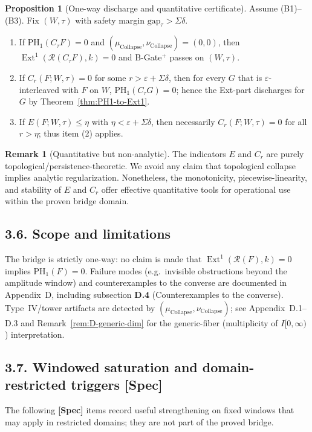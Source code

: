 \documentclass[11pt]{article}
\numberwithin{equation}{section}
\theoremstyle{plain}
\theoremstyle{definition}
\theoremstyle{remark}
\DeclareMathOperator{\Ext}{Ext}
\theoremstyle{plain}
\theoremstyle{definition}
\numberwithin{equation}{section}
\newtheorem{proposition}[theorem]{Proposition}
\theoremstyle{definition}
\newtheorem{remark}[theorem]{Remark}
\numberwithin{equation}{section}
\theoremstyle{plain}
\theoremstyle{definition}
\theoremstyle{remark}
\begin{document}
\begin{proposition}[One-way discharge and quantitative certificate]\label{prop:gate-certificate}
Assume \textup{(B1)}–\textup{(B3)}. Fix \((W,\tau)\) with safety margin \(\mathrm{gap}_\tau>\Sigma\delta\).
\begin{enumerate}
\item If \(\mathrm{PH}_1(C_\tau F)=0\) and \((\mu_{\mathrm{Collapse}},\nu_{\mathrm{Collapse}})=(0,0)\), then \(\Ext^1(\mathcal{R}(C_\tau F),k)=0\) and B-Gate\(^{+}\) passes on \((W,\tau)\).
\item If \(C_{r}(F;W,\tau)=0\) for some \(r>\varepsilon+\Sigma\delta\), then for every \(G\) that is \(\varepsilon\)-interleaved with \(F\) on \(W\), \(\mathrm{PH}_1(C_\tau G)=0\); hence the Ext-part discharges for \(G\) by Theorem~\ref{thm:PH1-to-Ext1}.
\item If \(E(F;W,\tau)\le \eta\) with \(\eta<\varepsilon+\Sigma\delta\), then necessarily \(C_r(F;W,\tau)=0\) for all \(r>\eta\); thus item \textup{(2)} applies.
\end{enumerate}
\end{proposition}

\begin{remark}[Quantitative but non-analytic]
The indicators \(E\) and \(C_r\) are purely topological/persistence-theoretic. We avoid any claim that topological collapse implies analytic regularization. Nonetheless, the monotonicity, piecewise-linearity, and stability of \(E\) and \(C_r\) offer effective quantitative tools for operational use within the proven bridge domain.
\end{remark}

\subsection*{3.6. Scope and limitations}
The bridge is strictly one-way: no claim is made that \(\Ext^1(\mathcal{R}(F),k)=0\) implies \(\mathrm{PH}_1(F)=0\).
Failure modes (e.g.\ invisible obstructions beyond the amplitude window) and counterexamples to the converse are documented in Appendix~D, including subsection \textbf{D.4} (Counterexamples to the converse). Type~IV/tower artifacts are detected by \((\mu_{\mathrm{Collapse}},\nu_{\mathrm{Collapse}})\); see Appendix~D.1–D.3 and Remark~\ref{rem:D-generic-dim} for the generic-fiber (multiplicity of \(I[0,\infty)\)) interpretation.

\subsection*{3.7. Windowed saturation and domain-restricted triggers \textup{[Spec]}}
The following \textbf{[Spec]} items record useful strengthening on fixed windows that may apply in restricted domains; they are not part of the proved bridge.
\end{document}
